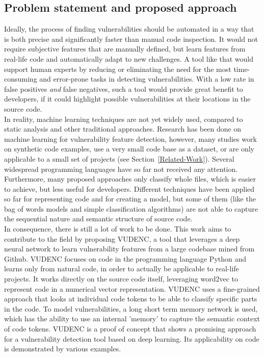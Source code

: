 \documentclass[
a4paper,
pagesize,
pdftex,
12pt,
ngerman,
fleqn,
final,
]{scrartcl}
\begin{document}
	\subsection{Problem statement and proposed approach}
	Ideally, the process of finding vulnerabilities should be automated in a way that is both precise and significantly faster than manual code inspection. It would not require subjective features that are manually defined, but learn features from real-life code and automatically adapt to new challenges. A tool like that would support human experts by reducing or eliminating the need for the most time-consuming and error-prone tasks in detecting vulnerabilities. With a low rate in false positives \textit{and} false negatives, such a tool would provide great benefit to developers, if it could highlight possible vulnerabilities at their locations in the source code.\\	
	In reality, machine learning techniques are not yet widely used, compared to static analysis and other traditional approaches. Research has been done on machine learning for vulnerability feature detection, however, many studies work on synthetic code examples, use a very small code base as a dataset, or are only applicable to a small set of projects (see Section~\ref{Related-Work}). Several widespread programming languages have so far not received any attention. Furthermore, many proposed approaches only classify whole files, which is easier to achieve, but less useful for developers. Different techniques have been applied so far for representing code and for creating a model, but some of them (like the bag of words models and simple classification algorithms) are not able to capture the sequential nature and semantic structure of source code.\\
	In consequence, there is still a lot of work to be done. This work aims to contribute to the field by proposing VUDENC, a tool that leverages a deep neural network to learn vulnerability features from a large codebase mined from Github. VUDENC focuses on code in the programming language Python and learns only from natural code, in order to actually be applicable to real-life projects. It works directly on the source code itself, leveraging word2vec to represent code in a numerical vector representation. VUDENC uses a fine-grained approach that looks at individual code tokens to be able to classify specific parts in the code. To model vulnerabilities, a long short term memory network is used, which has the ability to use an internal 'memory' to capture the semantic context of code tokens. VUDENC is a proof of concept that shows a promising approach for a vulnerability detection tool based on deep learning. Its applicability on code is demonstrated by various examples. 
	
\end{document}
